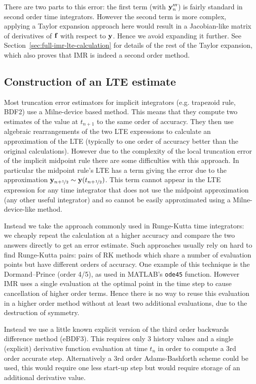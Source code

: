 There are two parts to this error: the first term (with $\mathbf{y}'''_n$) is fairly standard in second order time integrators.
However the second term is more complex, applying a Taylor expansion approach here would result in a Jacobian-like matrix of derivatives of ${\mathbf{f}}$ with respect to $\mathbf{y}$.
Hence we avoid expanding it further.
See Section~\ref{sec:full-imr-lte-calculation} for details of the rest of the Taylor expansion, which also proves that IMR is indeed a second order method.


\subsection{Construction of an LTE estimate}

Most truncation error estimators for implicit integrators (e.g. trapezoid rule, BDF2) use a Milne-device based method.\cite{gresho-sani} %
This means that they compute two estimates of the value at $t_{n+1}$ to the same order of accuracy.
They then use algebraic rearrangements of the two LTE expressions to calculate an approximation of the LTE (typically to one order of accuracy better than the original calculations).
However due to the complexity of the local truncation error of the implicit midpoint rule there are some difficulties with this approach.
In particular the midpoint rule's LTE has a term giving the error due to the approximation $\mathbf{y}_{n+\nicefrac{1}{2}} \sim \mathbf{y}(t_{n+\nicefrac{1}{2}})$.
This term cannot appear in the LTE expression for any time integrator that does not use the midpoint approximation (\ie any other useful integrator) and so cannot be easily approximated using a Milne-device-like method.

Instead we take the approach commonly used in Runge-Kutta time integrators: we cheaply repeat the calculation at a higher accuracy and compare the two answers directly to get an error estimate.
Such approaches usually rely on hard to find Runge-Kutta pairs: pairs of RK methods which share a number of evaluation points but have different orders of accuracy.
One example of this technique is the Dormand–Prince (order 4/5), as used in MATLAB's \texttt{ode45} function.
However IMR uses a single evaluation at the optimal point in the time step to cause cancellation of higher order terms.
Hence there is no way to reuse this evaluation in a higher order method without at least two additional evaluations, due to the destruction of symmetry.

Instead we use a little known explicit version of the third order backwards difference method (eBDF3).
This requires only 3 history values and a single (explicit) derivative function evaluation at time $t_n$ in order to compute a 3rd order accurate step.
Alternatively a 3rd order Adams-Bashforth scheme could be used, this would require one less start-up step but would require storage of an additional derivative value.

